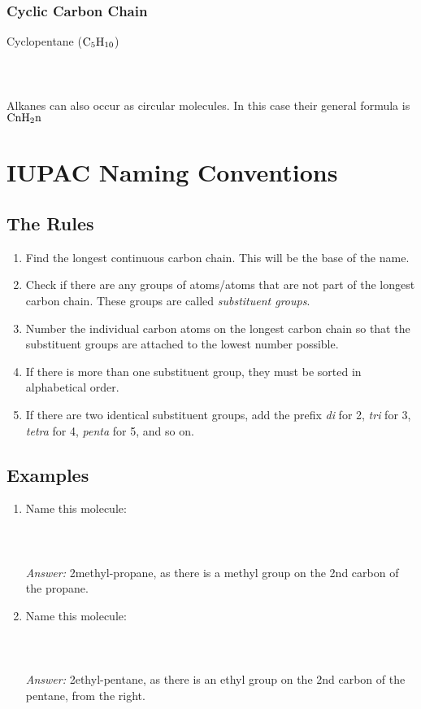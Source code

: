 \documentclass[11pt,twoside]{article}
\begin{document}
				\subsubsection{Cyclic Carbon Chain}
					Cyclopentane ($\ce{C5H10}$) \\ \\
					{\scriptsize {}} \\ \\
					Alkanes can also occur as circular molecules. In this case their general formula is $\ce{CnH2n}$

	\section{IUPAC Naming Conventions}
		\subsection{The Rules}
			\begin{enumerate}
				\item{Find the longest continuous carbon chain. This will be the base of the name.}
				\item{Check if there are any groups of atoms/atoms that are not part of the longest carbon chain. These groups are called \emph{substituent groups}.}
				\item{Number the individual carbon atoms on the longest carbon chain so that the substituent groups are attached to the lowest number possible.}
				\item{If there is more than one substituent group, they must be sorted in alphabetical order.}
				\item{If there are two identical substituent groups, add the prefix \emph{di} for 2, \emph{tri} for 3, \emph{tetra} for 4, \emph{penta} for 5, and so on.}
			\end{enumerate}
		\subsection{Examples}
			\begin{enumerate}
				\item{Name this molecule: \\ \\ {\scriptsize {}} \\ \\ \emph{Answer:} 2methyl-propane, as there is a methyl group on the 2nd carbon of the propane.}
				\item{Name this molecule: \\ \\ {\scriptsize {}} \\ \\ \emph{Answer:} 2ethyl-pentane, as there is an ethyl group on the 2nd carbon of the pentane, from the right.}
			\end{enumerate}
			
\end{document}
